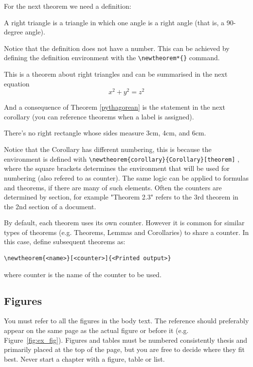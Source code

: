 For the next theorem we need a definition:

\begin{definition}
A right triangle is a triangle in which one angle is a right angle (that is, a 90-degree angle).
\end{definition}

Notice that the definition does not have a number. This can be achieved by defining the definition environment with the \verb+\newtheorem*{}+ command.

\begin{theorem}
\label{pythagorean}
This is a theorem about right triangles and can be summarised in the next 
equation 
\[ x^2 + y^2 = z^2 \]
\end{theorem}

And a consequence of Theorem \ref{pythagorean} is the statement in the next 
corollary (you can reference theorems when a label is assigned).

\begin{corollary}
There's no right rectangle whose sides measure 3cm, 4cm, and 6cm.
\end{corollary}

Notice that the Corollary has different numbering, this is because the environment is defined with \verb+\newtheorem{corollary}{Corollary}[theorem]+ , where the square brackets determines the environment that will be used for numbering (also refered to as counter). The same logic can be applied to formulas and theorems, if there are many of such elements. Often the counters are determined by section, for example "Theorem 2.3" refers to the 3rd theorem in the 2nd section of a document. 

By default, each theorem uses its own counter. However it is common for similar types of theorems (e.g. Theorems, Lemmas and Corollaries) to share a counter. In this case, define subsequent theorems as:
\begin{verbatim}
\newtheorem{<name>}[<counter>]{<Printed output>}
\end{verbatim}
where counter is the name of the counter to be used.


\subsection{Figures}

You must refer to all the figures in the body text. The reference
should preferably appear on the same page as the actual figure or
before it (e.g. Figure~\ref{fig:ex_fig}). Figures and tables must be numbered consistently thesis
and primarily placed at the top of the page, but you are free to
decide where they fit best. Never start a chapter with a figure, table
or list.

